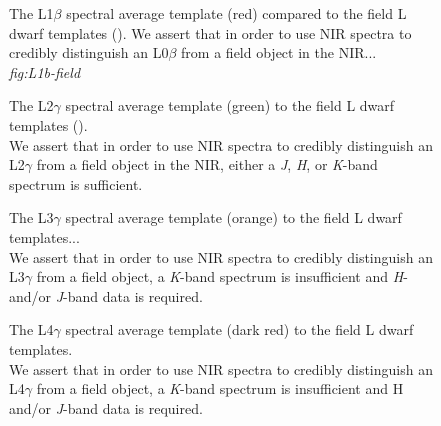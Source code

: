 \documentclass[12pt,preprint]{aastex}
\begin{document}
\begin{figure}
	\caption{The L1$\beta$ spectral average template (red) compared to the field L dwarf templates (). We assert that in order to use NIR spectra to credibly distinguish an L0$\beta$ from a field object in the NIR...\\
	\emph{fig:L1b-field}}
	\label{fig:L1b-field}
\end{figure}

\begin{figure}
	\caption{The L2$\gamma$ spectral average template (green) to the field L dwarf templates (). \\
	We assert that in order to use NIR spectra to credibly distinguish an L2$\gamma$ from a field object in the NIR, either a \emph{J}, \emph{H}, or \emph{K}-band spectrum is sufficient.}
	\label{fig:L2lg-field}
\end{figure}

\begin{figure}
	\caption{The L3$\gamma$ spectral average template (orange) to the field L dwarf templates... \\
	We assert that in order to use NIR spectra to credibly distinguish an L3$\gamma$ from a field object, a \emph{K}-band spectrum is insufficient and \emph{H}- and/or \emph{J}-band data is required.}
	\label{fig:L3lg-field}
\end{figure}

\begin{figure}
	\caption{The L4$\gamma$ spectral average template (dark red) to the field L dwarf templates. \\
	We assert that in order to use NIR spectra to credibly distinguish an L4$\gamma$ from a field object, a \emph{K}-band spectrum is insufficient and H and/or \emph{J}-band data is required.}
	\label{fig:L4lg-field}
\end{figure}

\end{document}
